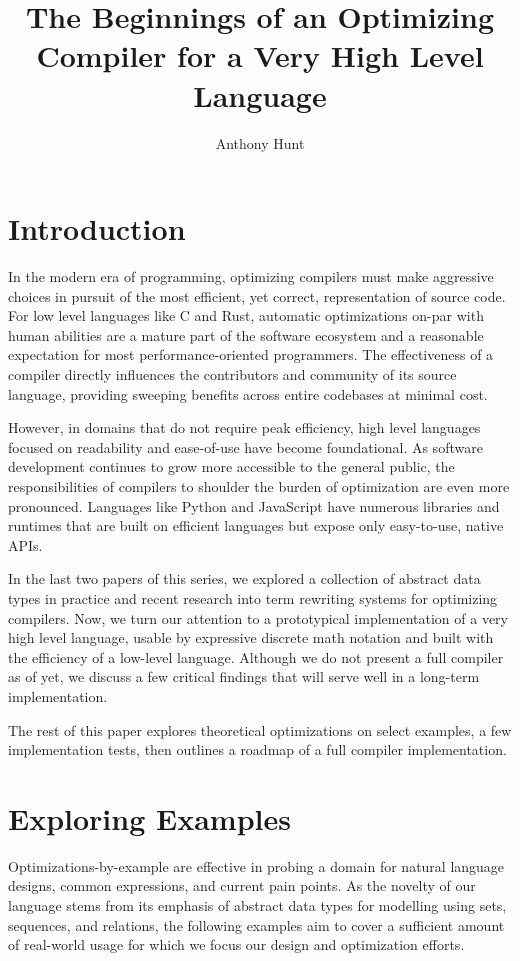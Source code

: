 \documentclass{article}
\title{The Beginnings of an Optimizing Compiler for a Very High Level Language}
\author{Anthony Hunt}
\begin{document}
\maketitle
\tableofcontents
\newpage

\section{Introduction}

In the modern era of programming, optimizing compilers must make aggressive choices in pursuit of the most efficient, yet correct, representation of source code. For low level languages like C and Rust, automatic optimizations on-par with human abilities are a mature part of the software ecosystem and a reasonable expectation for most performance-oriented programmers. The effectiveness of a compiler directly influences the contributors and community of its source language, providing sweeping benefits across entire codebases at minimal cost.

However, in domains that do not require peak efficiency, high level languages focused on readability and ease-of-use have become foundational. As software development continues to grow more accessible to the general public, the responsibilities of compilers to shoulder the burden of optimization are even more pronounced. Languages like Python and JavaScript have numerous libraries and runtimes that are built on efficient languages but expose only easy-to-use, native APIs.

In the last two papers of this series, we explored a collection of abstract data types in practice and recent research into term rewriting systems for optimizing compilers. Now, we turn our attention to a prototypical implementation of a very high level language, usable by expressive discrete math notation and built with the efficiency of a low-level language. Although we do not present a full compiler as of yet, we discuss a few critical findings that will serve well in a long-term implementation.

The rest of this paper explores theoretical optimizations on select examples, a few implementation tests, then outlines a roadmap of a full compiler implementation.

\section{Exploring Examples}

Optimizations-by-example are effective in probing a domain for natural language designs, common expressions, and current pain points. As the novelty of our language stems from its emphasis of abstract data types for modelling using sets, sequences, and relations, the following examples aim to cover a sufficient amount of real-world usage for which we focus our design and optimization efforts.
\end{document}
